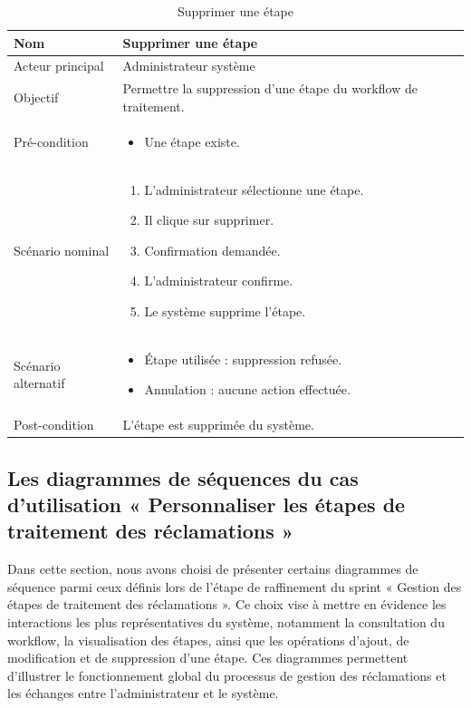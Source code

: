 \begin{table}[H]
\centering
\begin{tabular}{ |p{4cm}|p{12cm}|} \hline

Nom & Supprimer une étape \\ \hline

Acteur principal & Administrateur système \\ \hline

Objectif & Permettre la suppression d’une étape du workflow de traitement. \\ \hline

Pré-condition &
\begin{itemize}
    \item Une étape existe.
\end{itemize}
\\ \hline

Scénario nominal &
\begin{enumerate}
    \item L’administrateur sélectionne une étape.
    \item Il clique sur supprimer.
    \item Confirmation demandée.
    \item L’administrateur confirme.
    \item Le système supprime l’étape.
\end{enumerate}
\\ \hline

Scénario alternatif &
\begin{itemize}
    \item Étape utilisée : suppression refusée.
    \item Annulation : aucune action effectuée.
\end{itemize}
\\ \hline

Post-condition &
L’étape est supprimée du système. \\ \hline

\end{tabular}
\caption{Supprimer une étape}
\end{table}

\subsection{Les diagrammes de séquences du cas d’utilisation « Personnaliser les étapes de traitement des réclamations »}

Dans cette section, nous avons choisi de présenter certains diagrammes de séquence parmi ceux définis lors de l’étape de raffinement du sprint « Gestion des étapes de traitement des réclamations ». Ce choix vise à mettre en évidence les interactions les plus représentatives du système, notamment la consultation du workflow, la visualisation des étapes, ainsi que les opérations d’ajout, de modification et de suppression d’une étape. Ces diagrammes permettent d’illustrer le fonctionnement global du processus de gestion des réclamations et les échanges entre l’administrateur et le système.

